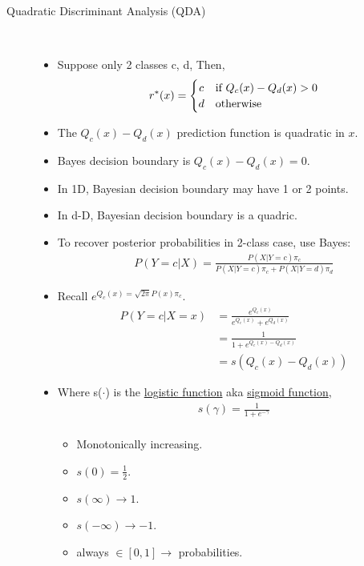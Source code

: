 \documentclass[10pt]{article}
\begin{document}
\begin{description}
	\item[Quadratic Discriminant Analysis (QDA)]
		\
		\begin{itemize}
			\item Suppose only 2 classes c, d, Then,
				\[
 				r^{*}(x) = \left\{\def\arraystretch{1.2}%
 					\begin{array}{@{}c@{\quad}l@{}}
    					c & \text{if $Q_{c}(x) - Q_{d}(x) > 0$}\\
   						d & \text{otherwise}\\
					\end{array}\right.
				\]
			\item The $Q_{c}(x) - Q_{d}(x)$ prediction function is quadratic in $x$.
			\item Bayes decision boundary is $Q_{c}(x) - Q_{d}(x) = 0$.
			\item In 1D, Bayesian decision boundary may have 1 or 2 points.
			\item In d-D, Bayesian decision boundary is a quadric. 
			\item To recover posterior probabilities in 2-class case, use Bayes:
				\begin{align*}
					P(Y=c|X) = \frac{P(X|Y=c)\pi_{c}}{P(X|Y=c)\pi_{c} + P(X|Y=d)\pi_{d}}
				\end{align*}
			\item Recall $e^{Q_{c}(x) = \sqrt{2\pi}P(x)\pi_{c}}$.
				\begin{align*}
					P(Y=c|X=x) &= \frac{e^{Q_{c}(x)}}{e^{Q_{c}(x)} + e^{Q_{d}(x)}}\\
					&= \frac{1}{1 + e^{Q_{c}(x) - Q_{d}(x)}}\\
					&= s(Q_{c}(x) - Q_{d}(x))
				\end{align*}
			\item Where s($\cdot$) is the \underline{logistic function} aka \underline{sigmoid function}, 
				\begin{align*}
					s(\gamma) = \frac{1}{1 + e^{-\gamma}}\\
				\end{align*}
				\begin{itemize}
					\item Monotonically increasing.\\
					\item $s(0) = \frac{1}{2}$.\\
					\item $s(\infty) \rightarrow 1$.\\
					\item $s(-\infty) \rightarrow -1$.\\
					\item always $\in [0, 1] \rightarrow$ probabilities.
				\end{itemize}
		\end{itemize}
		

\end{description}
\end{document}
